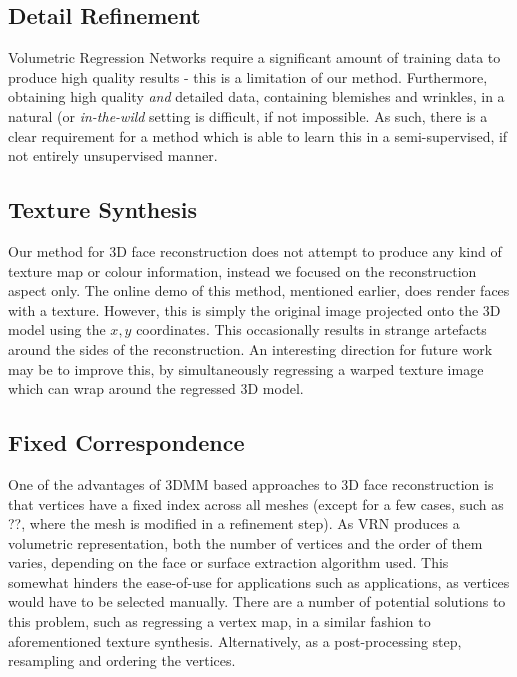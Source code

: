 \subsection{Detail Refinement} %

Volumetric Regression Networks require a significant amount of
training data to produce high quality results - this is a limitation
of our method. Furthermore, obtaining high quality \textit{and}
detailed data, containing blemishes and wrinkles, in a natural (or
\textit{in-the-wild} setting is difficult, if not impossible. As such,
there is a clear requirement for a method which is able to learn this
in a semi-supervised, if not entirely unsupervised manner.

\subsection{Texture Synthesis}

Our method for 3D face reconstruction does not attempt to produce any
kind of texture map or colour information, instead we focused on the
reconstruction aspect only. The online demo of this method, mentioned
earlier, does render faces with a texture. However, this is simply the
original image projected onto the 3D model using the $x,y$
coordinates. This occasionally results in strange artefacts around the
sides of the reconstruction. An interesting direction for future work
may be to improve this, by simultaneously regressing a warped texture
image which can wrap around the regressed 3D model.

\subsection{Fixed Correspondence}

One of the advantages of 3DMM based approaches to 3D face
reconstruction is that vertices have a fixed index across all meshes
(except for a few cases, such as ??, where the mesh is modified in a
refinement step). As VRN produces a volumetric representation, both
the number of vertices and the order of them varies, depending on the
face or surface extraction algorithm used. This somewhat hinders the
ease-of-use for applications such as applications, as vertices would
have to be selected manually. There are a number of potential
solutions to this problem, such as regressing a vertex map, in a
similar fashion to aforementioned texture synthesis. Alternatively, as
a post-processing step, resampling and ordering the vertices.



